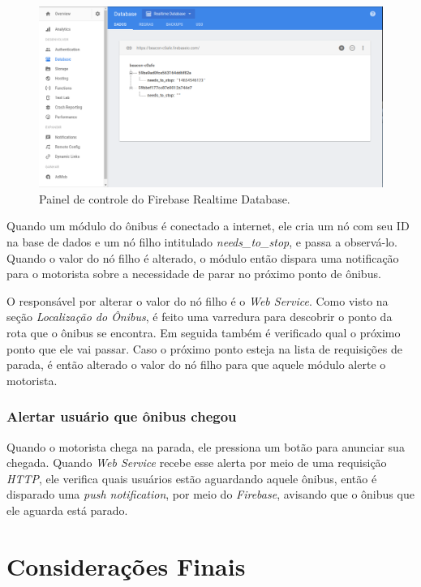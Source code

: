 \documentclass[
	12pt,				%
	oneside,			%
	a4paper,			%
	brazil				%
]{abntex2}
\begin{document}
{\begin{figure}[H]
\centering
\includegraphics[width=15cm, center]{images/realtime-database}
\caption{Painel de controle do Firebase Realtime Database.}
\label{Rotulo}
\end{figure}

Quando um módulo do ônibus é conectado a internet, ele cria um nó com seu ID na base de dados e um nó filho intitulado \textit{needs\_to\_stop}, e passa a observá-lo. Quando o valor do nó filho é alterado, o módulo então dispara uma notificação para o motorista sobre a necessidade de parar no próximo ponto de ônibus.

O responsável por alterar o valor do nó filho é o \textit{Web Service}. Como visto na seção \textit{Localização do Ônibus}, é feito uma varredura para descobrir o ponto da rota que o ônibus se encontra. Em seguida também é verificado qual o próximo ponto que ele vai passar. Caso o próximo ponto esteja na lista de requisições de parada, é então alterado o valor do nó filho para que aquele módulo alerte o motorista.

\subsection{Alertar usuário que ônibus chegou}

Quando o motorista chega na parada, ele pressiona um botão para anunciar sua chegada. Quando \textit{Web Service} recebe esse alerta por meio de uma requisição \textit{HTTP}, ele verifica quais usuários estão aguardando aquele ônibus, então é disparado uma \textit{push notification}, por meio do \textit{Firebase}, avisando que o ônibus que ele aguarda está parado.

\chapter{Considerações Finais}

}
\end{document}
